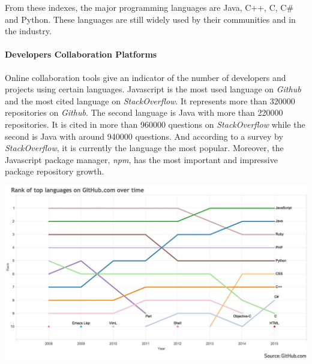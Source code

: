 From these indexes, the major programming languages are Java, C++, C, C\# and Python.
These languages are still widely used by their communities and in the industry.


\paragraph{Developers Collaboration Platforms}

Online collaboration tools give an indicator of the number of developers and projects using certain languages.
Javascript is the most used language on \textit{Github} and the most cited language on \textit{StackOverflow}.
It represents more than \num{320000} repositories on \textit{Github}.
The second language is Java with more than \num{220000} repositories.
It is cited in more than \num{960000} questions on \textit{StackOverflow} while the second is Java with around \num{940000} questions.
And according to a survey by \textit{StackOverflow}, it is currently the language the most popular.
Moreover, the Javascript package manager, \textit{npm}, has the most important and impressive package repository growth.


\includegraphics[width=0.9\linewidth]{../../data/js-trends/github-ranks}

